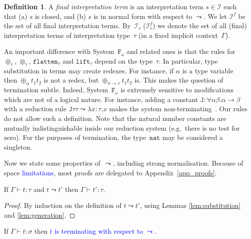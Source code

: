 \documentclass[a4paper,UKenglish,cleveref,autoref,numberwithinsect]{lipics-v2019}
\theoremstyle{definition}
\newtheorem{defn}[theorem]{Definition}
\newcommand{\Fomega}{\mathtt{F}_\omega}
\newcommand{\Iterms}{\mathcal{I}}
\newcommand{\arrtype}{\rightarrow}
\newcommand{\arrW}{\leadsto}
\newcommand{\nat}{\mathtt{nat}}
\newcommand{\flatten}{\mathtt{flatten}}
\newcommand{\lift}{\mathtt{lift}}
\newcommand{\SN}{\mathrm{SN}}
\newcommand{\proves}{\vdash}
\newcommand{\CKchange}[1]{\textcolor{blue}{#1}}
\begin{document}
\begin{defn}
  A \emph{final interpretation term} is an interpretation term $s \in
  \Iterms$ such that (a) $s$ is closed, and (b) $s$ is in normal form
  with respect to $\arrW$.  We let $\Iterms^f$ be the set of all final
  interpretation terms. By~$\Iterms_\tau$ ($\Iterms^f_\tau$) we denote
  the set of all (final) interpretation terms of interpretation
  type~$\tau$ (in a fixed implicit context~$\Gamma$).
\end{defn}

An important difference with System~$\Fomega$ and related ones is that
the rules for $\oplus_\tau$, $\otimes_\tau$, $\flatten_\tau$ and
$\lift_\tau$ depend on the type~$\tau$. In particular, type
substitution in terms may create redexes. For instance, if $\alpha$ is
a type variable then $\oplus_\alpha t_1 t_2$ is not a redex, but
$\oplus_{\sigma\arrtype\tau} t_1 t_2$ is. This makes the question of
termination subtle. Indeed, System~$\Fomega$ is extremely sensitive to
modifications which are not of a logical nature. For instance, adding
a constant $\mathtt{J} : \forall \alpha \beta . \alpha \arrtype \beta$
with a reduction rule $\mathtt{J} \tau \tau \leadsto \lambda x : \tau
. x$ makes the system non-terminating~\cite{Girard1971}. Our rules do
not allow such a definition. Note that the natural number constants
are mutually indistinguishable inside our reduction system (e.g.~there
is no test for zero). For the purposes of termination, the type~$\nat$
may be considered a singleton.

Now we state some properties of~$\arrW$, including strong
normalisation. Because of space \CKchange{limitations}, most proofs are
delegated to Appendix~\ref{app_proofs}.

\begin{lemma}
  If $\Gamma \proves t : \tau$ and $t \arrW t'$ then $\Gamma \proves
  t' : \tau$.
\end{lemma}

\begin{proof}
  By induction on the definition of $t \arrW t'$, using
  Lemmas \ref{lem:substitution} and \ref{lem:generation}.
\end{proof}


\begin{theorem}\label{thm_sn}
  If $\Gamma \proves t : \sigma$ then %
  \CKchange{$t$ is terminating with respect to $\arrW$}.
\end{theorem}
\end{document}
